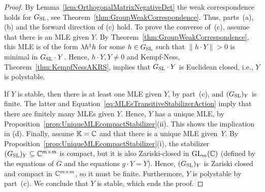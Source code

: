 \begin{proof}
	By Lemma~\ref{lem:OrthogonalMatrixNegativeDet} the weak correspondence holds for $G_{\operatorname{SL}}$, see Theorem~\ref{thm:GroupWeakCorrespondence}. Thus, parts~(a), (b) and the forward direction of (c) hold. To prove the converse of~(c), assume that there is an MLE given $Y$. By Theorem~\ref{thm:GroupWeakCorrespondence}, this MLE is of the form $\lambda h^{\dagger} h$ for some $h \in G_{\operatorname{SL}}$ such that $\| h \cdot Y \| > 0$ is minimal in $G_{\operatorname{SL}} \cdot Y$. Hence, $h\cdot Y, Y \neq 0$ and Kempf-Ness, Theorem~\ref{thm:KempfNessAKRS}, implies that $G_{\operatorname{SL}} \cdot Y$ is Euclidean closed, i.e., $Y$ is polystable.
	
	If $Y$ is stable, then there is at least one MLE given $Y$, by part~(c), and $(G_{\operatorname{SL}})_Y$ is finite. The latter and Equation~\eqref{eq:MLEsTransitiveStabilizerAction} imply that there are finitely many MLEs given $Y$. Hence, $Y$ has a unique MLE, by Proposition~\ref{prop:UniqueMLEcompactStabilizer}(ii). This shows the implication in (d). Finally, assume $\mathbb K = \mathbb C$ and that there is a unique MLE given~$Y$. By Proposition~\ref{prop:UniqueMLEcompactStabilizer}(i), the stabilizer $(G_{\operatorname{SL}})_Y \subseteq \mathbb C^{m \times m}$ is compact, but it is also Zariski-closed in $\operatorname{GL}_m(\mathbb C)$ (defined by the equations of $G$ and the equations $g \cdot Y = Y$). Hence, $(G_{\operatorname{SL}})_Y$ is Zariski closed and compact in $\mathbb C^{m \times m}$, so it must be finite. Furthermore, $Y$ is polystable by part~(c). We conclude that $Y$ is stable, which ends the proof.
\end{proof}

